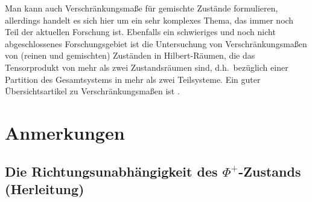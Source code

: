 Man kann auch Verschr\"ankungsma\ss e f\"ur gemischte
Zust\"ande formulieren, allerdings handelt es sich hier um ein
sehr komplexes Thema, das immer noch Teil der
aktuellen Forschung ist. Ebenfalls ein schwieriges und noch
nicht abgeschlossenes Forschungsgebiet ist die Untersuchung
von Verschr\"ankungsma\ss en von 
(reinen und gemischten) Zust\"anden in
Hilbert-R\"aumen, die das Tensorprodukt von mehr als zwei
Zustandsr\"aumen sind, d.h.\ bez\"uglich einer Partition des
Gesamtsystems in mehr als zwei Teilsysteme. Ein guter
\"Ubersichtsartikel zu Verschr\"ankungsma\ss en ist
\cite{Horodecki}. 

\section*{Anmerkungen}
\subsection*{Die Richtungsunabh\"angigkeit des $\Phi^+$-Zustands (Herleitung)}
\label{sec_Entanglement_A}

